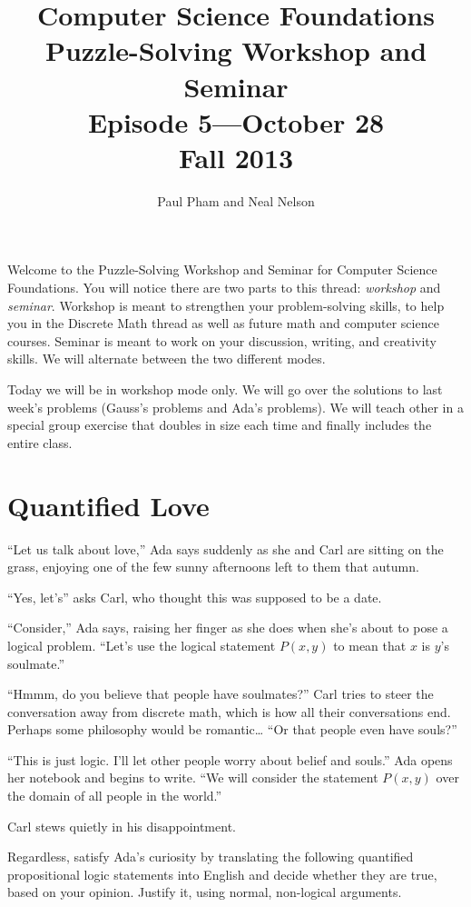 \documentclass{article}
\title{Computer Science Foundations\\ Puzzle-Solving Workshop and Seminar\\
\large{Episode 5---October 28}\\
Fall 2013}
\author{Paul Pham and Neal Nelson}
\begin{document}
\maketitle

Welcome to the Puzzle-Solving Workshop and Seminar for
Computer Science Foundations. You will notice there are
two parts to this thread: \emph{workshop} and \emph{seminar}.
Workshop is meant to strengthen your problem-solving skills,
to help you in the Discrete Math thread as well as future
math and computer science courses. Seminar is meant to
work on your discussion, writing, and creativity skills.
We will alternate between the two different modes.

Today we will be in workshop mode only. We will go over the
solutions to last week's problems (Gauss's problems and
Ada's problems). We will teach other in a special
group exercise that doubles in size each time and
finally includes the entire class.

\section{Quantified Love}

``Let us talk about love,'' Ada says suddenly as she and Carl are sitting
on the grass, enjoying one of the few sunny afternoons left to them that
autumn.

``Yes, let's'' asks Carl, who thought this was supposed to be a date.

``Consider,'' Ada says, raising her finger as she does when she's about to
pose a logical problem. ``Let's use the logical statement $P(x,y)$ to mean that
$x$ is $y$'s soulmate.''

``Hmmm, do you believe that people have soulmates?''
Carl tries to steer the conversation away from discrete math, which is how all
their conversations end. Perhaps some philosophy would be romantic\ldots
``Or that people even have souls?''

``This is just logic. I'll let other people worry about belief and souls.''
Ada opens her notebook and begins to write.
``We will consider the statement $P(x,y)$ over the domain of all people in
the world.''

Carl stews quietly in his disappointment.

Regardless, satisfy Ada's curiosity by
translating the following quantified propositional logic statements into
English and decide whether they are true, based on your opinion. Justify it,
using normal, non-logical arguments.
\end{document}
